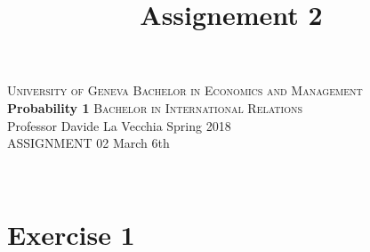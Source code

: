 \documentclass[12pt,thmsa]{article}
\title{Assignement 2}
\begin{document}
\noindent \textsc{University of Geneva}     \hfill \textsc{Bachelor in Economics and Management} \\
\textbf{Probability 1}                      \hfill \textsc{Bachelor in International Relations} \\
Professor Davide La Vecchia                 \hfill Spring 2018  \\
ASSIGNMENT 02                               \hfill   March 6th



\noindent
\makebox[\linewidth]{\rule{\textwidth}{0.4pt}}\\[1.5ex]

\section*{Exercise 1}
\end{document}
